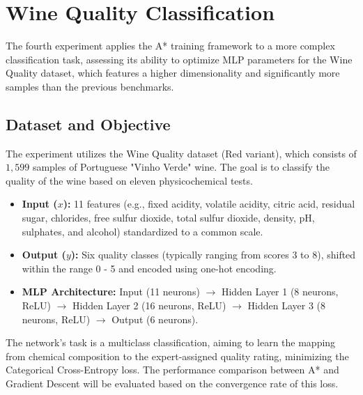 \newpage

\section{Wine Quality Classification}
\label{sec:wine_quality}

\noindent The fourth experiment applies the A* training framework to a more complex classification task, assessing its ability to optimize MLP parameters for the Wine Quality dataset, which features a higher dimensionality and significantly more samples than the previous benchmarks.

\subsection{Dataset and Objective}

The experiment utilizes the Wine Quality dataset (Red variant), which consists of $1,599$ samples of Portuguese "Vinho Verde" wine. The goal is to classify the quality of the wine based on eleven physicochemical tests.

\begin{itemize}
    \item \textbf{Input ($x$):} 11 features (e.g., fixed acidity, volatile acidity, citric acid, residual sugar, chlorides, free sulfur dioxide, total sulfur dioxide, density, pH, sulphates, and alcohol) standardized to a common scale.
    \item \textbf{Output ($y$):} Six quality classes (typically ranging from scores 3 to 8), shifted within the range 0 - 5 and encoded using one-hot encoding.
    \item \textbf{MLP Architecture:} Input (11 neurons) $\rightarrow$ 
      Hidden Layer 1 (8 neurons, ReLU) $\rightarrow$ 
      Hidden Layer 2 (16 neurons, ReLU) $\rightarrow$ 
      Hidden Layer 3 (8 neurons, ReLU) $\rightarrow$ 
      Output (6 neurons).
\end{itemize}

\noindent The network's task is a multiclass classification, aiming to learn the mapping from chemical composition to the expert-assigned quality rating, minimizing the Categorical Cross-Entropy loss. The performance comparison between A* and Gradient Descent will be evaluated based on the convergence rate of this loss.

